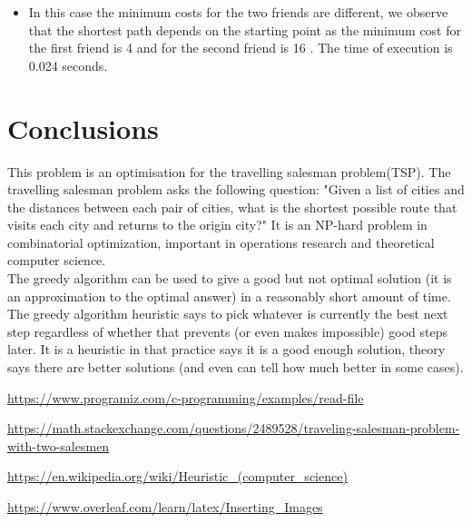 \documentclass{article}
\begin{document}
\begin{figure}[h!]
\centering
\label{fig:crypt}
\end{figure}
\begin{itemize}
    \item In this case the minimum costs for the two friends are different, we observe that the shortest path depends on the starting point as the minimum cost for the first friend is 4 and for the second friend is 16 . The time of execution is 0.024 seconds.\\
\end{itemize}


\pagebreak

\section{Conclusions}


This problem is an optimisation for the travelling salesman problem(TSP).
The travelling salesman problem asks the following question: "Given a list of cities and the distances between each pair of cities, what is the shortest possible route that visits each city and returns to the origin city?" It is an NP-hard problem in combinatorial optimization, important in operations research and theoretical computer science.\\
\linebreak
The greedy algorithm can be used to give a good but not optimal solution (it is an approximation to the optimal answer) in a reasonably short amount of time. The greedy algorithm heuristic says to pick whatever is currently the best next step regardless of whether that prevents (or even makes impossible) good steps later. It is a heuristic in that practice says it is a good enough solution, theory says there are better solutions (and even can tell how much better in some cases).\\
\linebreak

\pagebreak

\begin{thebibliography}{9}


\url{https://www.programiz.com/c-programming/examples/read-file}


\url{https://math.stackexchange.com/questions/2489528/traveling-salesman-problem-with-two-salesmen}

\url{https://en.wikipedia.org/wiki/Heuristic_(computer_science)}


\url{https://www.overleaf.com/learn/latex/Inserting_Images}

\end{thebibliography}
\pagebreak

 

    
\end{document}
